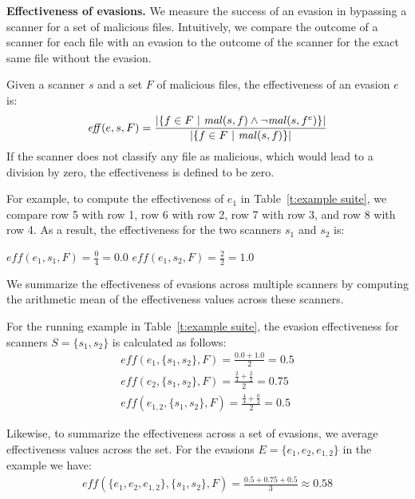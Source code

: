 \textbf{Effectiveness of evasions.} We measure the success of an evasion in bypassing a scanner for a set of malicious files.
Intuitively, we compare the outcome of a scanner for each file with an evasion to the outcome of the scanner for the exact same file without the evasion.

\begin{definition}
Given a scanner $s$ and a set $F$ of malicious files, the effectiveness of an evasion $e$ is:
$$
\mathit{eff}(e, s, F) = \frac
{|\{ f \in F ~|~ \mathit{mal}(s,f) \wedge \neg \mathit{mal}(s,f^{e}) \}|}
{|\{ f \in F ~|~ \mathit{mal}(s,f) \}|} \\
$$
If the scanner does not classify any file as malicious, which would lead to a division by zero, the effectiveness is defined to be zero.
\label{def: eff}
\end{definition}

For example, to compute the effectiveness of $e_{1}$ in Table~\ref{t:example suite}, we
compare row 5 with row 1, row 6 with row 2, row 7 with row 3, and row 8 with row 4.
As a result, the effectiveness for the two scanners $s_1$ and $s_2$ is:

\vspace{.5em}
{
	\centering
	$\mathit{eff}(e_{1}, s_1, F) = \frac{0}{4} = 0.0$
	\hspace{2em} 
	$\mathit{eff}(e_{1}, s_2, F) = \frac{2}{2} = 1.0$\\
}
\vspace{.5em}

We summarize the effectiveness of evasions across multiple scanners
by computing the arithmetic mean of the effectiveness values across these scanners.

For the running example in Table~\ref{t:example suite}, the evasion effectiveness for scanners $S=\{s_1,s_2\}$ is calculated as follows:
\begin{gather*}
\mathit{eff}(e_{1}, \{s_1, s_2\}, F) = \frac{0.0 + 1.0}{2} = 0.5 \\
\mathit{eff}(e_{2}, \{s_1, s_2\}, F) = \frac{\frac{2}{4} + \frac{2}{2}}{2} = 0.75 \\
\mathit{eff}(e_{1,2}, \{s_1, s_2\}, F) = \frac{\frac{4}{4} + \frac{0}{2}}{2} = 0.5
\end{gather*}

Likewise, to summarize the effectiveness across a set of evasions, we average effectiveness values across the set. For the evasions $E=\{e_1,e_2,e_{1,2}\}$ in the example we have:
\begin{gather*}
\mathit{eff}(\{e_{1}, e_{2}, e_{1,2}\}, \{s_1, s_2\}, F) = \frac{0.5 + 0.75 + 0.5}{3} \approx 0.58
\end{gather*}


